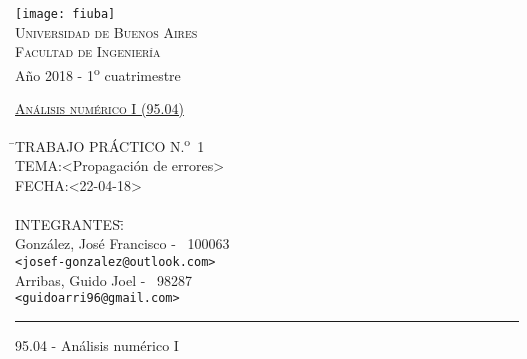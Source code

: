 \documentclass[a4paper, 10pt, spanish]{article}
\newcommand{\Nro}{N.\textsuperscript{o}\xspace}
\begin{document}
\marginsize{2cm}{2cm}{2cm}{2cm}
%
%
\begin{titlepage}

\thispagestyle{empty}

\begin{center}
\texttt{[image: fiuba]}\\
\large{\textsc{Universidad de Buenos Aires}}\\
\large{\textsc{Facultad de Ingeniería}}\\
\small{Año 2018 - 1\textsuperscript{o} cuatrimestre}
\end{center}

\vfill

\begin{center} %
\Large{\underline{\textsc{Análisis numérico I (95.04)}}}
\end{center}

\vfill

\begin{tabbing}
\hspace{2cm}\=\+TRABAJO PRÁCTICO \Nro~1\\
	TEMA:\textless{Propagación de errores}\textgreater{}\\
	FECHA:\textless{}22-04-18\textgreater{}\\%
\\
	INTEGRANTES:\hspace{-1cm}\=\+\hspace{1cm}\=\hspace{6cm}\=\\
		González, José Francisco	\>\>- \ 100063\\
			\>\footnotesize{\verb!<josef-gonzalez@outlook.com>!}\\
		Arribas, Guido Joel	\>\>- \ 98287\\
			\>\footnotesize{\verb!<guidoarri96@gmail.com>!}\\
		

\end{tabbing}

\vfill

\hrule
\vspace{0.2cm}

\noindent\small{95.04 - Análisis numérico I \hfill }

\end{titlepage}

%
%
\setcounter{page}{1}
\end{document}
